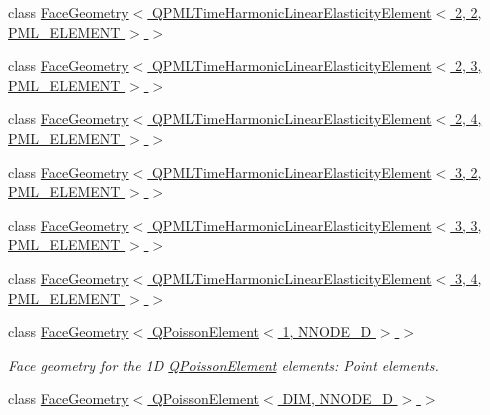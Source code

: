 \begin{DoxyCompactItemize}
\item 
class \hyperlink{classoomph_1_1FaceGeometry_3_01QPMLTimeHarmonicLinearElasticityElement_3_012_00_012_00_01PML__ELEMENT_01_4_01_4}{Face\+Geometry$<$ Q\+P\+M\+L\+Time\+Harmonic\+Linear\+Elasticity\+Element$<$ 2, 2, P\+M\+L\+\_\+\+E\+L\+E\+M\+E\+N\+T $>$ $>$}
\item 
class \hyperlink{classoomph_1_1FaceGeometry_3_01QPMLTimeHarmonicLinearElasticityElement_3_012_00_013_00_01PML__ELEMENT_01_4_01_4}{Face\+Geometry$<$ Q\+P\+M\+L\+Time\+Harmonic\+Linear\+Elasticity\+Element$<$ 2, 3, P\+M\+L\+\_\+\+E\+L\+E\+M\+E\+N\+T $>$ $>$}
\item 
class \hyperlink{classoomph_1_1FaceGeometry_3_01QPMLTimeHarmonicLinearElasticityElement_3_012_00_014_00_01PML__ELEMENT_01_4_01_4}{Face\+Geometry$<$ Q\+P\+M\+L\+Time\+Harmonic\+Linear\+Elasticity\+Element$<$ 2, 4, P\+M\+L\+\_\+\+E\+L\+E\+M\+E\+N\+T $>$ $>$}
\item 
class \hyperlink{classoomph_1_1FaceGeometry_3_01QPMLTimeHarmonicLinearElasticityElement_3_013_00_012_00_01PML__ELEMENT_01_4_01_4}{Face\+Geometry$<$ Q\+P\+M\+L\+Time\+Harmonic\+Linear\+Elasticity\+Element$<$ 3, 2, P\+M\+L\+\_\+\+E\+L\+E\+M\+E\+N\+T $>$ $>$}
\item 
class \hyperlink{classoomph_1_1FaceGeometry_3_01QPMLTimeHarmonicLinearElasticityElement_3_013_00_013_00_01PML__ELEMENT_01_4_01_4}{Face\+Geometry$<$ Q\+P\+M\+L\+Time\+Harmonic\+Linear\+Elasticity\+Element$<$ 3, 3, P\+M\+L\+\_\+\+E\+L\+E\+M\+E\+N\+T $>$ $>$}
\item 
class \hyperlink{classoomph_1_1FaceGeometry_3_01QPMLTimeHarmonicLinearElasticityElement_3_013_00_014_00_01PML__ELEMENT_01_4_01_4}{Face\+Geometry$<$ Q\+P\+M\+L\+Time\+Harmonic\+Linear\+Elasticity\+Element$<$ 3, 4, P\+M\+L\+\_\+\+E\+L\+E\+M\+E\+N\+T $>$ $>$}
\item 
class \hyperlink{classoomph_1_1FaceGeometry_3_01QPoissonElement_3_011_00_01NNODE__1D_01_4_01_4}{Face\+Geometry$<$ Q\+Poisson\+Element$<$ 1, N\+N\+O\+D\+E\+\_\+D $>$ $>$}
\begin{DoxyCompactList}\small\item\em Face geometry for the 1D \hyperlink{classoomph_1_1QPoissonElement}{Q\+Poisson\+Element} elements\+: Point elements. \end{DoxyCompactList}\item 
class \hyperlink{classoomph_1_1FaceGeometry_3_01QPoissonElement_3_01DIM_00_01NNODE__1D_01_4_01_4}{Face\+Geometry$<$ Q\+Poisson\+Element$<$ D\+I\+M, N\+N\+O\+D\+E\+\_\+D $>$ $>$}
\item 

\end{DoxyCompactItemize}
